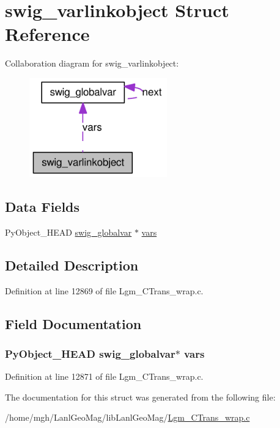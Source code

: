 \hypertarget{structswig__varlinkobject}{
\section{swig\_\-varlinkobject Struct Reference}
\label{structswig__varlinkobject}
}
Collaboration diagram for swig\_\-varlinkobject:\nopagebreak
\begin{figure}[H]
\begin{center}
\leavevmode
\includegraphics[width=169pt]{structswig__varlinkobject__coll__graph}
\end{center}
\end{figure}
\subsection*{Data Fields}
\begin{CompactItemize}
\item 
PyObject\_\-HEAD \hyperlink{structswig__globalvar}{swig\_\-globalvar} $\ast$ \hyperlink{structswig__varlinkobject_64a30a7c2383b2e2a7bd8aeb3e492449}{vars}
\end{CompactItemize}


\subsection{Detailed Description}


Definition at line 12869 of file Lgm\_\-CTrans\_\-wrap.c.

\subsection{Field Documentation}
\hypertarget{structswig__varlinkobject_64a30a7c2383b2e2a7bd8aeb3e492449}{
\subsubsection[{vars}]{\setlength{\rightskip}{0pt plus 5cm}PyObject\_\-HEAD {\bf swig\_\-globalvar}$\ast$ {\bf vars}}}
\label{structswig__varlinkobject_64a30a7c2383b2e2a7bd8aeb3e492449}




Definition at line 12871 of file Lgm\_\-CTrans\_\-wrap.c.

The documentation for this struct was generated from the following file:\begin{CompactItemize}
\item 
/home/mgh/LanlGeoMag/libLanlGeoMag/\hyperlink{_lgm___c_trans__wrap_8c}{Lgm\_\-CTrans\_\-wrap.c}\end{CompactItemize}
